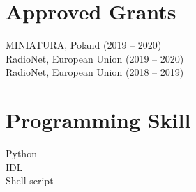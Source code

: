 \documentclass[a4paper, 11pt]{article}
\renewenvironment{itemize}{
  \begin{list}{}{
    \setlength{\leftmargin}{1.5em}
  }
}{
  \end{list}
}
\begin{document}
\section*{Approved Grants}
MINIATURA, Poland (2019 -- 2020)\\
RadioNet, European Union (2019 -- 2020)\\
RadioNet, European Union (2018 -- 2019)



\begin{comment}
\section*{Approved PI Proposals}
\begin{itemize}
\item
ALMA Cycle 3,
``Do galaxies lose molecular gas more than expected?'' (2015)
\item
EAO JCMT,
``Are red QSOs caused by warm dust from star-forming activities?'' (2015)
\item
EAO JCMT,
``Molecular outflows from nearby starburst galaxies'' (2015)
\item
NCRA GMRT,
``Constrain the SED of the Unidentified Fermi Object at Radio Band'' (2013)
\end{itemize}
\end{comment}

\section*{Programming Skill}
Python\\ IDL\\ Shell-script
\end{document}
